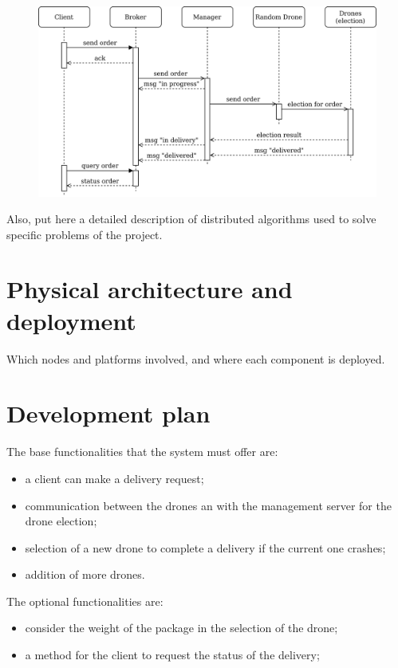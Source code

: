\documentclass[a4paper, oneside]{memoir}
\begin{document}
\begin{figure}[h!]
	\centering
	\includegraphics[width=\linewidth]{New-order}
\end{figure}

Also, put here a detailed description of distributed algorithms used to solve specific problems of the project.

\section{Physical architecture and deployment}
Which nodes and platforms involved, and where each component is deployed.

\section{Development plan}
The base functionalities that the system must offer are:
\begin{itemize}
\item a client can make a delivery request;
\item communication between the drones an with the management server for the drone election;
\item selection of a new drone to complete a delivery if the current one crashes;
\item addition of more drones.
\end{itemize}
The optional functionalities are:
\begin{itemize}
\item consider the weight of the package in the selection of the drone;
\item a method for the client to request the status of the delivery;
\end{itemize}

\end{document}
